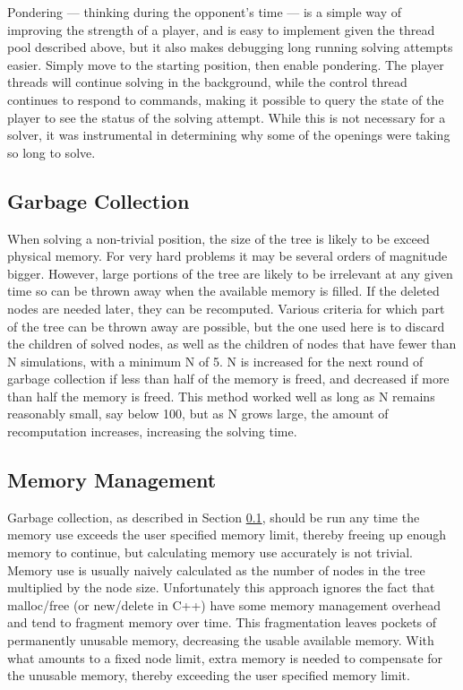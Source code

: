 Pondering --- thinking during the opponent's time --- is a simple way of improving the strength of a player, and is easy to implement given the thread pool described above, but it also makes debugging long running solving attempts easier. Simply move to the starting position, then enable pondering. The player threads will continue solving in the background, while the control thread continues to respond to commands, making it possible to query the state of the player to see the status of the solving attempt. While this is not necessary for a solver, it was instrumental in determining why some of the openings were taking so long to solve.


\subsection{Garbage Collection}\label{sec:gc}

When solving a non-trivial position, the size of the tree is likely to be exceed physical memory. For very hard problems it may be several orders of magnitude bigger. However, large portions of the tree are likely to be irrelevant at any given time so can be thrown away when the available memory is filled. If the deleted nodes are needed later, they can be recomputed. Various criteria for which part of the tree can be thrown away are possible, but the one used here is to discard the children of solved nodes, as well as the children of nodes that have fewer than N simulations, with a minimum N of 5. N is increased for the next round of garbage collection if less than half of the memory is freed, and decreased if more than half the memory is freed. This method worked well as long as N remains reasonably small, say below 100, but as N grows large, the amount of recomputation increases, increasing the solving time.


\subsection{Memory Management}\label{sec:memory}

Garbage collection, as described in Section \ref{sec:gc}, should be run any time the memory use exceeds the user specified memory limit, thereby freeing up enough memory to continue, but calculating memory use accurately is not trivial. Memory use is usually naively calculated as the number of nodes in the tree multiplied by the node size. Unfortunately this approach ignores the fact that malloc/free (or new/delete in C++) have some memory management overhead and tend to fragment memory over time. This fragmentation leaves pockets of permanently unusable memory, decreasing the usable available memory. With what amounts to a fixed node limit, extra memory is needed to compensate for the unusable memory, thereby exceeding the user specified memory limit.

